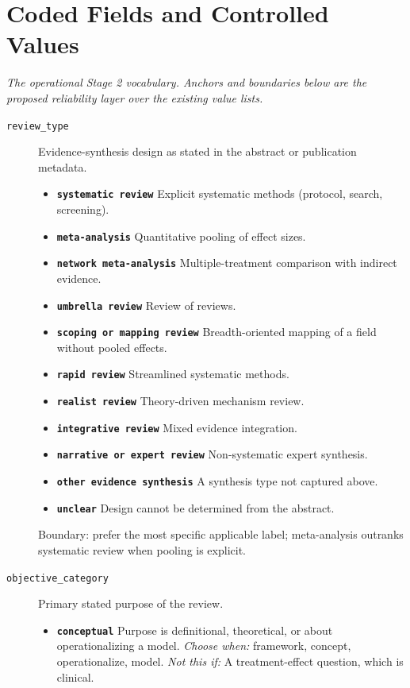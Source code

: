 \documentclass[11pt]{article}
\begin{document}
\section*{Coded Fields and Controlled Values}
{\small\itshape The operational Stage 2 vocabulary. Anchors and boundaries below are the proposed reliability layer over the existing value lists.}\par\smallskip
\begin{description}
\item[\texttt{review\_type}] Evidence-synthesis design as stated in the abstract or publication metadata.
  \begin{itemize}[leftmargin=1.3em,itemsep=2pt,topsep=2pt]
  \item \textbf{\texttt{systematic review}} Explicit systematic methods (protocol, search, screening).
  \item \textbf{\texttt{meta-analysis}} Quantitative pooling of effect sizes.
  \item \textbf{\texttt{network meta-analysis}} Multiple-treatment comparison with indirect evidence.
  \item \textbf{\texttt{umbrella review}} Review of reviews.
  \item \textbf{\texttt{scoping or mapping review}} Breadth-oriented mapping of a field without pooled effects.
  \item \textbf{\texttt{rapid review}} Streamlined systematic methods.
  \item \textbf{\texttt{realist review}} Theory-driven mechanism review.
  \item \textbf{\texttt{integrative review}} Mixed evidence integration.
  \item \textbf{\texttt{narrative or expert review}} Non-systematic expert synthesis.
  \item \textbf{\texttt{other evidence synthesis}} A synthesis type not captured above.
  \item \textbf{\texttt{unclear}} Design cannot be determined from the abstract.
  \end{itemize}
{\small Boundary: prefer the most specific applicable label; meta-analysis outranks systematic review when pooling is explicit.}
\item[\texttt{objective\_category}] Primary stated purpose of the review.
  \begin{itemize}[leftmargin=1.3em,itemsep=2pt,topsep=2pt]
  \item \textbf{\texttt{conceptual}} Purpose is definitional, theoretical, or about operationalizing a model. {\small \textit{Choose when:} framework, concept, operationalize, model. \textit{Not this if:} A treatment-effect question, which is clinical.}

\end{itemize}
\end{description}
\end{document}
